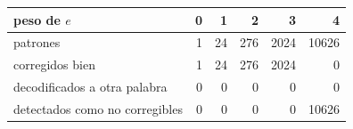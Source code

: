 \begin{tabular}{@{}l*{5}{r}@{}}
\toprule
peso de $e$ & 0 & 1 & 2 & 3 & 4 \\
\midrule
patrones & 1 & 24 & 276 & 2024 & 10626 \\
corregidos bien & 1 & 24 & 276 & 2024 & 0 \\
decodificados a otra palabra & 0 & 0 & 0 & 0 & 0 \\
detectados como no corregibles & 0 & 0 & 0 & 0 & 10626 \\
\bottomrule
\end{tabular}
